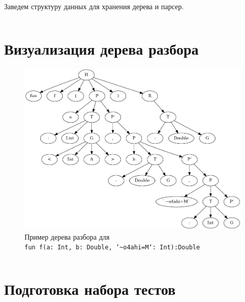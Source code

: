 Заведем структуру данных для хранения дерева и парсер.

\inputminted[bgcolor=bg]{kotlin}{lab2/src/main/kotlin/Parser.kt}

\section{Визуализация дерева разбора}

\begin{figure}[h]
    \centering
    \includegraphics[scale=0.4]{lab2/tree.png}
    \caption{Пример дерева разбора для\\\texttt{fun f(a: Int, b: Double, `\~{}o4ahi=M`: Int):Double}}
\end{figure}

\inputminted[bgcolor=bg]{kotlin}{lab2/src/main/kotlin/Main.kt}

\section{Подготовка набора тестов}

